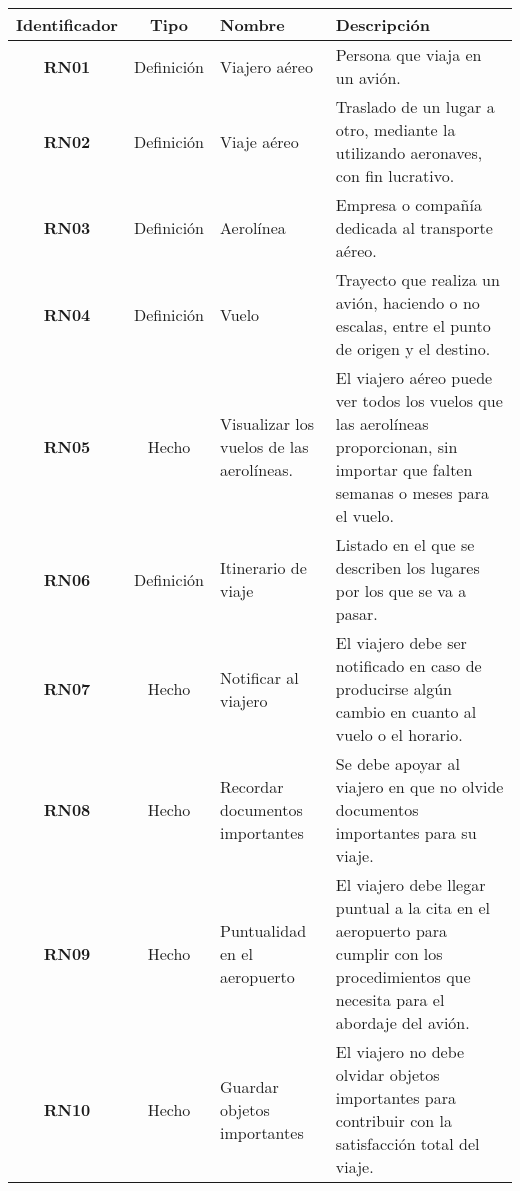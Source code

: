 \begin{table}
	\begin{center}
		\begin{tabular}{|c|c|p{3cm}|p{5.7cm}|}
			\hline \rowcolor[RGB]{0,102,204} 
				\textcolor{blanco}{\bf Identificador} &
				\textcolor{blanco}{\bf Tipo} &
				\textcolor{blanco}{\bf Nombre} &
				\textcolor{blanco}{\bf Descripción} \\
			\hline \rowcolor[RGB]{224,224,224} 
				\textbf{RN01} &
				Definición &
				Viajero aéreo &
				Persona que viaja en un avión. \\
      		\hline 
      			\textbf{RN02} &
				Definición &
				Viaje aéreo &
				Traslado de un lugar a otro, mediante la  utilizando aeronaves, con fin lucrativo. \\
			\hline \rowcolor[RGB]{224,224,224} 
				\textbf{RN03} &
				Definición &
				Aerolínea &
				Empresa o compañía dedicada al transporte aéreo. \\ 
			\hline
				\textbf{RN04} &
				Definición &
				Vuelo &
				Trayecto que realiza un avión, haciendo o no escalas, entre el punto de origen y el destino. \\ 
			\hline \rowcolor[RGB]{224,224,224} 
				\textbf{RN05} &
				Hecho &
				Visualizar los vuelos de las aerolíneas. &
				El viajero aéreo puede ver todos los vuelos que las aerolíneas proporcionan, sin importar que falten semanas o meses para el vuelo. \\ 
			\hline
				\textbf{RN06} &
				Definición &
				Itinerario de viaje &
				Listado en el que se describen los lugares por los que se va a pasar. \\ 
			\hline \rowcolor[RGB]{224,224,224} 
				\textbf{RN07} &
				Hecho &
				Notificar al viajero &
				El viajero debe ser notificado en caso de producirse algún cambio en cuanto al vuelo o el horario. \\ 
			\hline
				\textbf{RN08} &
				Hecho &
				Recordar documentos importantes &
				Se debe apoyar al viajero en que no olvide documentos importantes para su viaje. \\ 
			\hline \rowcolor[RGB]{224,224,224} 
				\textbf{RN09} &
				Hecho &
				Puntualidad en el aeropuerto &
				El viajero debe llegar puntual a la cita en el aeropuerto para cumplir con los procedimientos que necesita para el abordaje del avión. \\ 
			\hline
				\textbf{RN10} &
				Hecho &
				Guardar objetos importantes &
				El viajero no debe olvidar objetos importantes para contribuir con la satisfacción total del viaje. \\ 

\end{tabular}
\end{center}
\end{table}
